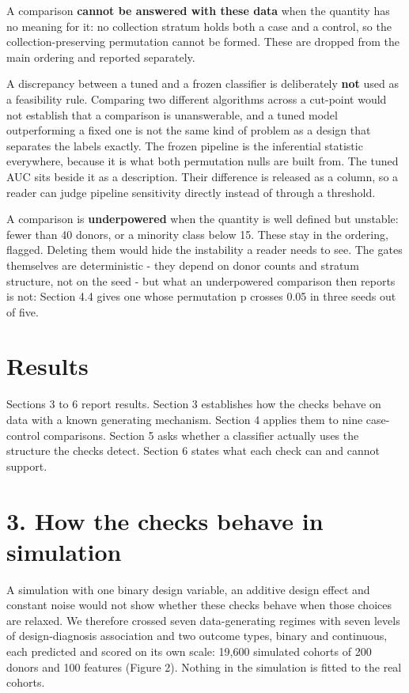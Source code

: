 A comparison \textbf{cannot be answered with these data} when the quantity has no meaning for it: no collection stratum holds both a case and a control, so the collection-preserving permutation cannot be formed. These are dropped from the main ordering and reported separately.

A discrepancy between a tuned and a frozen classifier is deliberately \textbf{not} used as a feasibility rule. Comparing two different algorithms across a cut-point would not establish that a comparison is unanswerable, and a tuned model outperforming a fixed one is not the same kind of problem as a design that separates the labels exactly. The frozen pipeline is the inferential statistic everywhere, because it is what both permutation nulls are built from. The tuned AUC sits beside it as a description. Their difference is released as a column, so a reader can judge pipeline sensitivity directly instead of through a threshold.

A comparison is \textbf{underpowered} when the quantity is well defined but unstable: fewer than 40 donors, or a minority class below 15. These stay in the ordering, flagged. Deleting them would hide the instability a reader needs to see. The gates themselves are deterministic - they depend on donor counts and stratum structure, not on the seed - but what an underpowered comparison then reports is not: Section 4.4 gives one whose permutation p crosses 0.05 in three seeds out of five.

\section{Results}\label{results}

Sections 3 to 6 report results. Section 3 establishes how the checks behave on data with a known generating mechanism. Section 4 applies them to nine case-control comparisons. Section 5 asks whether a classifier actually uses the structure the checks detect. Section 6 states what each check can and cannot support.

\section{3. How the checks behave in simulation}\label{how-the-checks-behave-in-simulation}

A simulation with one binary design variable, an additive design effect and constant noise would not show whether these checks behave when those choices are relaxed. We therefore crossed seven data-generating regimes with seven levels of design-diagnosis association and two outcome types, binary and continuous, each predicted and scored on its own scale: 19,600 simulated cohorts of 200 donors and 100 features (Figure 2). Nothing in the simulation is fitted to the real cohorts.

